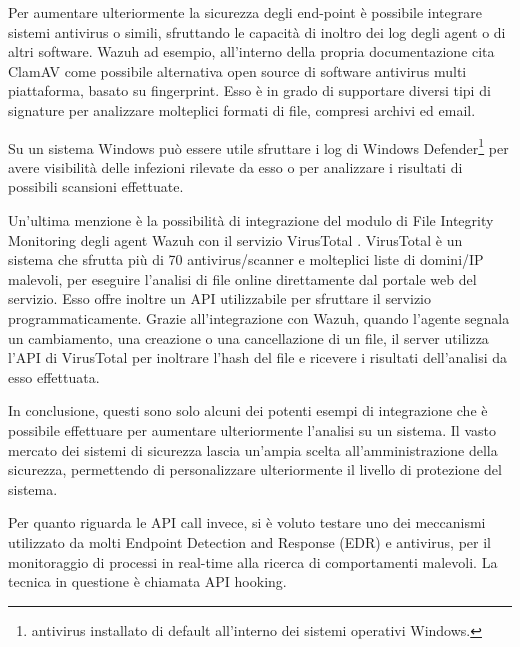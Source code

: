 \medskip


Per aumentare ulteriormente la sicurezza degli end-point è possibile integrare sistemi antivirus o simili, sfruttando le capacità di inoltro dei log degli agent o di altri software.  Wazuh ad esempio, all'interno della propria documentazione cita ClamAV \cite{clamav} come possibile alternativa open source di software antivirus multi piattaforma, basato su fingerprint. Esso è in grado di supportare diversi tipi di signature per analizzare molteplici formati di file, compresi archivi ed email.

Su un sistema Windows può essere utile sfruttare i log di Windows Defender\footnote{antivirus installato di default all'interno dei sistemi operativi Windows.} per avere visibilità delle infezioni rilevate da esso o per analizzare i risultati di possibili scansioni effettuate.

Un'ultima menzione è la possibilità di integrazione del modulo di File Integrity Monitoring degli agent Wazuh con il servizio VirusTotal \cite{virustotal}. VirusTotal è un sistema che sfrutta più di 70 antivirus/scanner e molteplici liste di domini/IP malevoli, per eseguire l'analisi di file online direttamente dal portale web del servizio. Esso offre inoltre un API utilizzabile per sfruttare il servizio programmaticamente. Grazie all'integrazione con Wazuh, quando l'agente segnala un cambiamento, una creazione o una cancellazione di un file, il server  utilizza l'API di VirusTotal per inoltrare l'hash del file e ricevere i risultati dell'analisi da esso effettuata.

In conclusione, questi sono solo alcuni dei potenti esempi di integrazione che è possibile effettuare per aumentare ulteriormente l'analisi su un sistema. Il vasto mercato dei sistemi di sicurezza lascia un'ampia scelta all'amministrazione della sicurezza, permettendo di personalizzare ulteriormente il livello di protezione del sistema.


\medskip

 
Per quanto riguarda le API call invece, si è voluto testare  uno dei meccanismi utilizzato da molti  Endpoint Detection and Response (EDR) e antivirus, per il monitoraggio di  processi in real-time alla ricerca di comportamenti malevoli.  
La tecnica in questione è chiamata API hooking. 

